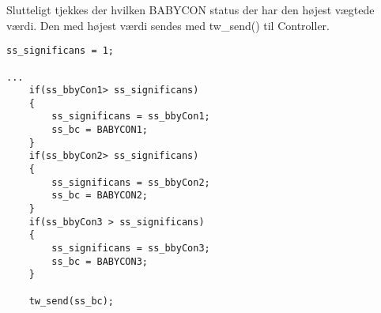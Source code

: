 Slutteligt tjekkes der hvilken BABYCON status der har den højest vægtede værdi. Den med højest værdi sendes med tw\_send() til Controller. 
\begin{verbatim}
ss_significans = 1;

...
    if(ss_bbyCon1> ss_significans)
    {
        ss_significans = ss_bbyCon1;
        ss_bc = BABYCON1;
    }
    if(ss_bbyCon2> ss_significans)
    {
        ss_significans = ss_bbyCon2;
        ss_bc = BABYCON2;
    }
    if(ss_bbyCon3 > ss_significans)
    {
        ss_significans = ss_bbyCon3;
        ss_bc = BABYCON3;
    }

    tw_send(ss_bc);
\end{verbatim}